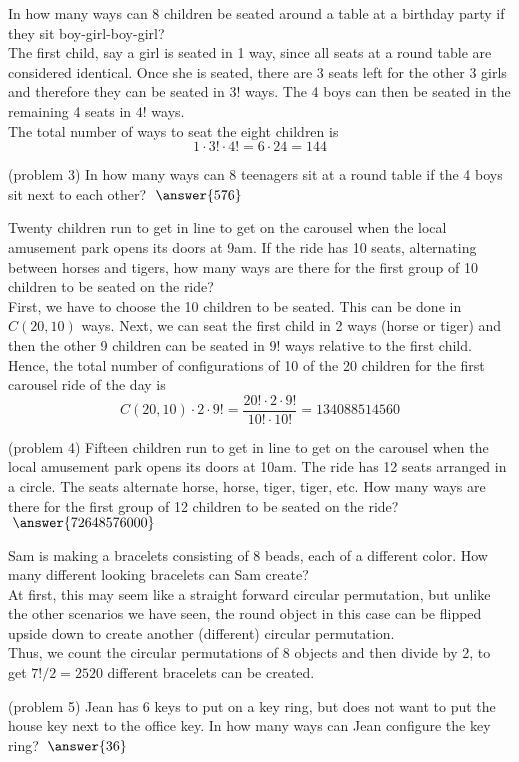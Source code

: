 \documentclass[handout]{ximera}
\begin{document}
\begin{example}[example 3]
In how many ways can 8 children be seated around a table at a birthday 
party if they sit boy-girl-boy-girl?\\
The first child, say a girl is seated in 1 way, since all seats at a round 
table are considered identical. Once she is seated, there are 3 seats left 
for the other 3 girls and therefore they can be seated in $3!$ ways.  
The 4 boys can then be seated in the remaining 4 seats in $4!$ ways.\\
The total number of ways to seat the eight children is 
\[
1\cdot 3! \cdot 4! = 6 \cdot 24 = 144
\]

\end{example}


\begin{problem}(problem 3)
In how many ways can 8 teenagers sit at a round table if the 4 boys sit next to each other?
$\; \answer{576}$
\end{problem}


\begin{example}[example 4]
Twenty children run to get in line to get on the carousel when the local amusement 
park opens its doors at 9am. If the ride has 10 seats, alternating between 
horses and tigers, how many ways are there for the first group of 10 
children to be seated on the ride?\\
First, we have to choose the 10 children to be seated.  This can be done in $C(20,10)$ ways.
Next, we can seat the first child in 2 ways (horse or tiger) and then the other 9 children 
can be seated in $9!$ ways relative to the first child.\\
Hence, the total number of configurations of 10 of the 20 children for the 
first carousel ride of the day is 
\[
C(20,10) \cdot 2 \cdot 9! = \frac{20! \cdot 2 \cdot 9!}{10!\cdot 10!} = 134088514560
\]
\end{example}


\begin{problem}(problem 4)
Fifteen children run to get in line to get on the carousel when the local amusement 
park opens its doors at 10am. The ride has 12 seats arranged in a circle. 
The seats alternate horse, horse, tiger, tiger, etc. 
How many ways are there for the first group of 12 
children to be seated on the ride? $\; \answer{72648576000}$

\end{problem}


\begin{example}[example 5]
Sam is making a bracelets consisting of 8 beads, each of a different color. 
How many different looking bracelets can Sam create?\\
At first, this may seem like a straight forward circular permutation, 
but unlike the other scenarios we have seen, the round object in this 
case can be flipped upside down to create another (different) circular permutation.\\
Thus, we count the circular permutations of $8$ objects and then divide by 2, to get
$7!/2 = 2520$ different bracelets can be created.
\end{example}


\begin{problem}(problem 5)
Jean has 6 keys to put on a key ring, but does not want to put the house key 
next to the office key.  In how many ways can Jean configure the key ring? $\; \answer{36}$
\end{problem}
\end{document}
